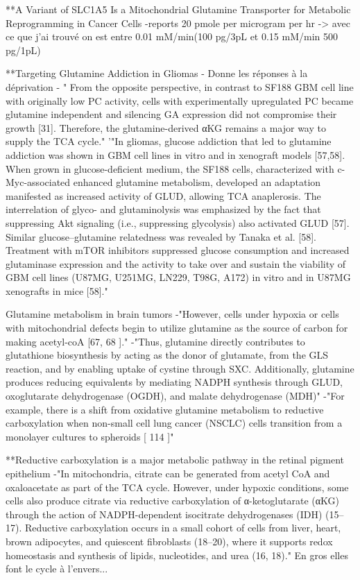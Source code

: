 \documentclass[11pt,a4paper]{article}
\begin{document}
**A Variant of SLC1A5 Is a Mitochondrial Glutamine Transporter for Metabolic Reprogramming in Cancer Cells
-reports 20 pmole per microgram per hr ->  avec ce que j'ai trouvé on est entre 0.01 mM/min(100 pg/3pL et 0.15 mM/min 500 pg/1pL)

**Targeting Glutamine Addiction in Gliomas
- Donne les réponses à  la déprivation
- " From the opposite perspective, in contrast to SF188 GBM cell line with originally low PC activity, cells with experimentally upregulated PC became glutamine independent and silencing GA expression did not compromise their growth [31]. Therefore, the glutamine-derived αKG remains a major way to supply the TCA cycle."
'"In gliomas, glucose addiction that led to glutamine addiction was shown in GBM cell lines in vitro and in xenograft models [57,58]. When grown in glucose-deficient medium, the SF188 cells, characterized with c-Myc-associated enhanced glutamine metabolism, developed an adaptation manifested as increased activity of GLUD, allowing TCA anaplerosis. The interrelation of glyco- and glutaminolysis was emphasized by the fact that suppressing Akt signaling (i.e., suppressing glycolysis) also activated GLUD [57]. Similar glucose–glutamine relatedness was revealed by Tanaka et al. [58]. Treatment with mTOR inhibitors suppressed glucose consumption and increased glutaminase expression and the activity to take over and sustain the viability of GBM cell lines (U87MG, U251MG, LN229, T98G, A172) in vitro and in U87MG xenografts in mice [58]."

Glutamine metabolism in brain tumors
-"However, cells under hypoxia or cells with
mitochondrial defects begin to utilize glutamine as the source of carbon for making acetyl-coA [67, 68 ]."
-"Thus, glutamine directly contributes to glutathione biosynthesis by
acting as the donor of glutamate, from the GLS reaction, and by enabling uptake of cystine through
SXC. Additionally, glutamine produces reducing equivalents by mediating NADPH synthesis through
GLUD, oxoglutarate dehydrogenase (OGDH), and malate dehydrogenase (MDH)"
-"For example, there is a shift from oxidative glutamine metabolism to reductive carboxylation when
non-small cell lung cancer (NSCLC) cells transition from a monolayer cultures to spheroids [ 114 ]"


**Reductive carboxylation is a major metabolic pathway in the retinal pigment epithelium
-"In mitochondria, citrate can be generated from acetyl CoA and oxaloacetate as part of the TCA cycle. However, under hypoxic conditions, some cells also produce citrate via reductive carboxylation of α-ketoglutarate (αKG) through the action of NADPH-dependent isocitrate dehydrogenases (IDH) (15–17). Reductive carboxylation occurs in a small cohort of cells from liver, heart, brown adipocytes, and quiescent fibroblasts (18–20), where it supports redox homeostasis and synthesis of lipids, nucleotides, and urea (16, 18)."  En gros elles font le cycle à l'envers...
\end{document}
